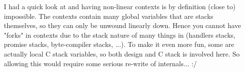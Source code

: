 I had a quick look at \R and having non-linear contexts is by definition (close to) impossible. The contexts contain many global variables that are stacks themselves, so they can only be unwound linearly down. Hence you cannot have "forks" in contexts due to the stack nature of many things in \R (handlers stacks, promise stacks, byte-compiler stacks, ...). To make it even more fun, some are actually local C stack variables, so both \R design and C stack is involved here. So allowing this would require some serious re-write of \R internals... :/
